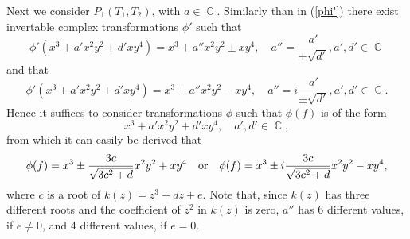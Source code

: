 \documentclass[noend]{amsproc}
\theoremstyle{definition}
\DeclareMathOperator{\C}{\mathbb{C}}
\begin{document}
Next we consider $P_1(T_1,T_2)$, with $a\in\C$. Similarly than in (\ref{phi'}) there exist invertable complex transformations $\phi'$ such that
\begin{equation}
\phi'(x^3+a'x^2y^2+d'xy^4)=x^3+a''x^2y^2\pm xy^4,\quad a''=\frac{a'}{\pm\sqrt{d'}}, a',d'\in\C
\end{equation}
and that
\begin{equation}
\phi'(x^3+a'x^2y^2+d'xy^4)=x^3+a''x^2y^2-xy^4,\quad a''=i\frac{a'}{\pm\sqrt{d'}}, a', d'\in\C.
\end{equation}
Hence it suffices to consider transformations $\phi$ such that $\phi(f)$ is of the form
\begin{equation}
x^3+a'x^2y^2+d'xy^4,\quad a',d'\in\C,
\end{equation}
from which it can easily be derived that
\begin{equation}\label{eqc'1}
\phi(f)=x^3\pm\frac{3c}{\sqrt{3{c}^2+d}}x^2y^2+xy^4\quad\textnormal{or}\quad\phi(f)=x^3\pm i\frac{3c}{\sqrt{3{c}^2+d}}x^2y^2-xy^4,
\end{equation}
where $c$ is a root of $k(z)=z^3+dz+e$. Note that, since $k(z)$ has three different roots and the coefficient of $z^2$ in $k(z)$ is zero, $a''$ has $6$ different values, if $e\neq 0$, and $4$ different values, if $e=0$.
\end{document}
